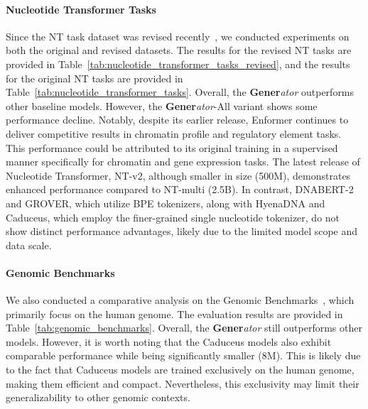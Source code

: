 \paragraph{Nucleotide Transformer Tasks}
Since the NT task dataset was revised recently~\cite{nucleotide-transformer}, we conducted experiments on both the original and revised datasets. The results for the revised NT tasks are provided in Table~\ref{tab:nucleotide_transformer_tasks_revised}, and the results for the original NT tasks are provided in Table~\ref{tab:nucleotide_transformer_tasks}. Overall, the \textbf{Gener}\textit{ator} outperforms other baseline models. However, the \textbf{Gener}\textit{ator}-All variant shows some performance decline. Notably, despite its earlier release, Enformer continues to deliver competitive results in chromatin profile and regulatory element tasks. This performance could be attributed to its original training in a supervised manner specifically for chromatin and gene expression tasks. The latest release of Nucleotide Transformer, NT-v2, although smaller in size (500M), demonstrates enhanced performance compared to NT-multi (2.5B). In contrast, DNABERT-2 and GROVER, which utilize BPE tokenizers, along with HyenaDNA and Caduceus, which employ the finer-grained single nucleotide tokenizer, do not show distinct performance advantages, likely due to the limited model scope and data scale.

\paragraph{Genomic Benchmarks}
We also conducted a comparative analysis on the Genomic Benchmarks~\cite{genomic-benchmarks}, which primarily focus on the human genome. The evaluation results are provided in Table~\ref{tab:genomic_benchmarks}. Overall, the \textbf{Gener}\textit{ator} still outperforms other models. However, it is worth noting that the Caduceus models also exhibit comparable performance while being significantly smaller (8M). This is likely due to the fact that Caduceus models are trained exclusively on the human genome, making them efficient and compact. Nevertheless, this exclusivity may limit their generalizability to other genomic contexts.

